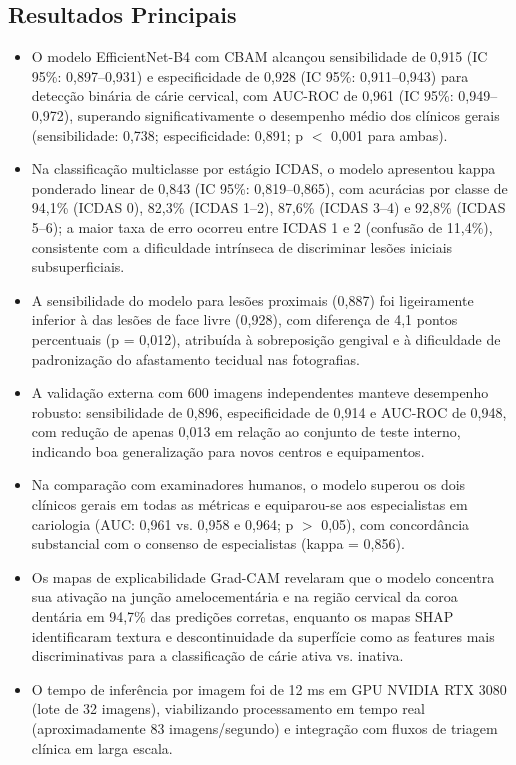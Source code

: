 \subsection{Resultados Principais}
\begin{itemize}
  \item O modelo EfficientNet-B4 com CBAM alcançou sensibilidade de
        0,915 (IC 95\%: 0,897--0,931) e especificidade de 0,928
        (IC 95\%: 0,911--0,943) para detecção binária de cárie
        cervical, com AUC-ROC de 0,961 (IC 95\%: 0,949--0,972),
        superando significativamente o desempenho médio dos clínicos
        gerais (sensibilidade: 0,738; especificidade: 0,891;
        p $<$ 0,001 para ambas).
  \item Na classificação multiclasse por estágio ICDAS, o modelo
        apresentou kappa ponderado linear de 0,843 (IC 95\%:
        0,819--0,865), com acurácias por classe de 94,1\% (ICDAS 0),
        82,3\% (ICDAS 1--2), 87,6\% (ICDAS 3--4) e 92,8\%
        (ICDAS 5--6); a maior taxa de erro ocorreu entre ICDAS 1 e 2
        (confusão de 11,4\%), consistente com a dificuldade intrínseca
        de discriminar lesões iniciais subsuperficiais.
  \item A sensibilidade do modelo para lesões proximais (0,887) foi
        ligeiramente inferior à das lesões de face livre (0,928),
        com diferença de 4,1 pontos percentuais (p = 0,012),
        atribuída à sobreposição gengival e à dificuldade de
        padronização do afastamento tecidual nas fotografias.
  \item A validação externa com 600 imagens independentes manteve
        desempenho robusto: sensibilidade de 0,896, especificidade
        de 0,914 e AUC-ROC de 0,948, com redução de apenas 0,013
        em relação ao conjunto de teste interno, indicando boa
        generalização para novos centros e equipamentos.
  \item Na comparação com examinadores humanos, o modelo superou os
        dois clínicos gerais em todas as métricas e equiparou-se
        aos especialistas em cariologia (AUC: 0,961 vs. 0,958 e
        0,964; p $>$ 0,05), com concordância substancial com o
        consenso de especialistas (kappa = 0,856).
  \item Os mapas de explicabilidade Grad-CAM revelaram que o modelo
        concentra sua ativação na junção amelocementária e na região
        cervical da coroa dentária em 94,7\% das predições corretas,
        enquanto os mapas SHAP identificaram textura e descontinuidade
        da superfície como as features mais discriminativas para a
        classificação de cárie ativa vs. inativa.
  \item O tempo de inferência por imagem foi de 12 ms em GPU NVIDIA
        RTX 3080 (lote de 32 imagens), viabilizando processamento em
        tempo real (aproximadamente 83 imagens/segundo) e integração
        com fluxos de triagem clínica em larga escala.
\end{itemize}

